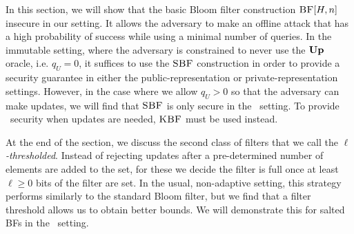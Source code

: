 In this section, we will show that the basic Bloom filter construction
$\textnormal{\textsc{BF}}[H,n]$ insecure in our setting. It allows the adversary to make an offline
attack that has a high probability of success while using a minimal number of
queries. In the immutable setting, where the adversary is constrained to never
use the $\textup{\textbf{Up}}\hspace{0.5pt}$ oracle, i.e. $q_U = 0$, it suffices to use the $\textnormal{\textsc{SBF}}$
construction in order to provide a security guarantee in either the
public-representation or private-representation settings. However, in the case
where we allow $q_U > 0$ so that the adversary can make updates, we will find
that $\textnormal{\textsc{SBF}}$ is only secure in the \erreps\ setting. To provide \errep\ security
when updates are needed, $\textnormal{\textsc{KBF}}$ must be used instead.

At the end of the section, we discuss the second class of filters that we call the
\emph{$\ell$-thresholded}. Instead of rejecting updates after a pre-determined
number of elements are added to the set, for these we decide the filter is full
once at least $\ell\geq0$ bits of the filter are set.
%
In the usual, non-adaptive setting, this strategy performs
similarly to the standard Bloom filter, but we find that a filter threshold
allows us to obtain better bounds.
%
We will demonstrate this for salted BFs in the \erreps\ setting.
%


